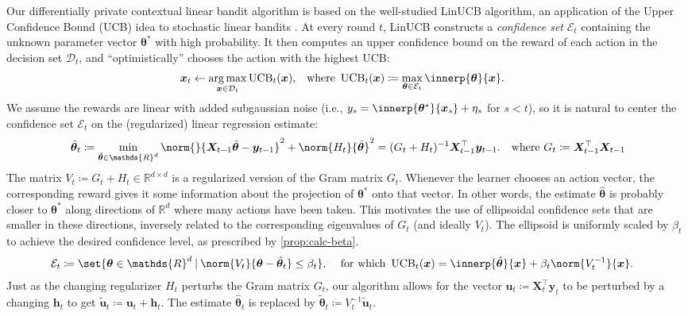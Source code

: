 \documentclass{article}
\renewcommand{\vec}[1]{\bm{#1}}
\newcommand{\defeq}{\coloneq}
\newcommand{\inv}[1]{#1^{-1}}
\newcommand{\Real}{\mathds{R}}
\newcommand{\UCB}{\operatorname{UCB}}
\DeclareMathOperator*{\argmax}{arg\,max}
\newcommand\given[1][\delimsize]{%
  \providecommand{\delimsize}{}
  \nonscript\:#1\vert\allowbreak\nonscript\:\mathopen{}
}
\newcommand{\E}{\mathcal{E}}
\providecommand\transp{\top}
\let\transpsymbol\transp
\renewcommand{\transp}[1]{#1^\transpsymbol}
\newcommand{\Dset}[1]{\mathcal{D}_{#1}}
\newcommand{\XtX}[1]{\transp{#1}{#1}}
\begin{document}
Our differentially private contextual linear bandit algorithm is based
on the well-studied LinUCB algorithm, an application of the Upper
Confidence Bound (UCB) idea to stochastic linear bandits
\citep{DaniStochasticLinearOptimization2008,RusmevichientongLinearlyParameterizedBandits2010,AbbasiYadkoriImprovedAlgorithmsLinear2011}.
At every round $t$, LinUCB constructs a \emph{confidence set} $\E_t$
containing the unknown parameter vector $\vec\theta^*$ with high
probability.  It then computes an upper confidence bound on the reward
of each action in the decision set $\Dset{t}$, and ``optimistically''
chooses the action with the highest UCB:
\begin{align}\label{eq:def-ucb}
  \vec x_t &\gets \argmax_{\vec x\in\Dset{t}} \UCB_t(\vec x),
  &\text{where }
  \UCB_t(\vec x) &\defeq \max_{\vec\theta\in\E_t} \innerp{\vec\theta}{\vec x}.
\end{align}
We assume the rewards are linear with added subgaussian noise (i.e.,
$y_s = \innerp{\vec\theta^*}{\vec x_s} + \eta_s$ for $s<t$), so it is
natural to center the confidence set $\E_t$ on the (regularized)
linear regression estimate:
\begin{align*}
  \hat{\vec\theta}_t
  &\defeq \min_{\hat{\vec\theta} \in \Real^d} \norm{}{\vec X_{t-1} \hat{\vec\theta}
    - \vec y_{t-1}}^2 + \norm{H_t}{\hat{\vec\theta}}^2
    = \inv{(G_t + H_t)} \transp{\vec X_{t-1}} \vec y_{t-1}.
    &\text{where } G_t \defeq \XtX{\vec X_{t-1}}
\end{align*}
The matrix $V_t \defeq G_t + H_t \in \Real^{d\times d}$ is a regularized
version of the Gram matrix $G_t$.  Whenever the learner chooses an
action vector, the corresponding reward gives it some information
about the projection of $\vec\theta^*$ onto that vector.  In other
words, the estimate $\hat{\vec\theta}$ is probably closer to
$\vec\theta^*$ along directions of $\Real^d$ where many actions have
been taken.  This motivates the use of ellipsoidal confidence sets
that are smaller in these directions, inversely related to the
corresponding eigenvalues of $G_t$ (and ideally $V_t$). The ellipsoid
is uniformly scaled by $\beta_t$ to achieve the desired confidence
level, as prescribed by \cref{prop:calc-beta}.
\begin{align}\label{eq:def-ellip}
  \E_t &\defeq \set{\vec\theta\in\Real^d \given
        \norm{V_t}{\vec\theta-\hat{\vec\theta}_t} \le \beta_t},
  &\text{ for which }
    \UCB_t(\vec x) &= \innerp{\hat{\vec\theta}}{\vec x} + \beta_t\norm{\inv{V_t}}{\vec x}.
\end{align}
Just as the changing regularizer $H_t$ perturbs the Gram matrix $G_t$,
our algorithm allows for the vector
$\vec u_t \defeq \transp{\vec X_t} \vec y_t$ to be perturbed by a
changing $\vec h_t$ to get
$\tilde{\vec u}_t \defeq \vec u_t + \vec h_t$.  The estimate
$\hat{\vec\theta}_t$ is replaced by
$\tilde{\vec\theta}_t \defeq \inv{V_t}\tilde{\vec u}_t$.
\end{document}
